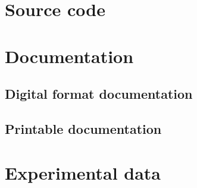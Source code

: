 \chapter{Source code}
\cite{ElGamal85, Kerckhoffs, McGarrity2014, Ariely2002, Dossogne2011a, Dossogne2012a, Oakley20140731, Oakley2015, Kruger1999, Dossogne2014}
\chapter{Documentation}
\section{Digital format documentation}
\section{Printable documentation}

\chapter{Experimental data}